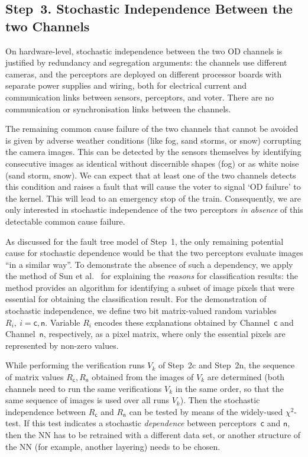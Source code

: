 \documentclass[runningheads,a4paper]{llncs}
\begin{document}
\subsection{Step~3. Stochastic Independence Between the two Channels}\label{sec:independence}

On hardware-level, stochastic independence between the two OD channels  is justified by  redundancy and segregation arguments: the channels use different cameras, and the perceptors  
are deployed on different processor boards with separate power supplies and wiring, both for electrical current and communication links between sensors, perceptors, and voter. There are no communication or synchronisation links between the channels.

The remaining common cause failure of the two channels that cannot be avoided is given by adverse weather conditions (like fog, sand storms, or  snow) corrupting the camera images. This can be detected by the sensors themselves by identifying consecutive images as identical without discernible shapes (fog) or as white noise (sand storm, snow). We can expect that at least one of the two channels detects this condition and raises a fault that will cause the voter to signal `OD failure' to the kernel. This will lead to an emergency stop of the train.  
Consequently, we are only interested in stochastic independence of the two perceptors {\it in absence} of this detectable common cause failure.

As discussed for the fault tree model of Step~1, the only remaining potential cause for   stochastic dependence would be that the two perceptors evaluate images ``in a similar way''.
To demonstrate the absence of such a dependency, we apply the method of Sun et al.~\cite{DBLP:conf/eccv/SunCHK20} for explaining the {\it reasons} for classification results: the method provides an algorithm for identifying a subset of image pixels that were essential for obtaining the classification result. For the demonstration of stochastic independence, we
define  two  bit matrix-valued random variables $R_i,\ i = \mathsf{c},\mathsf{n}$. 
Variable $R_i$ encodes these explanations obtained by Channel~$\mathsf{c}$ and Channel~$\mathsf{n}$, respectively, as  a pixel matrix, where only the essential pixels are represented by non-zero values. 

While performing the verification runs $V_k$ of Step~2c and Step~2n, the sequence of matrix values $R_\mathsf{c}, R_\mathsf{n}$ obtained from the images of $V_k$ are determined (both channels need to run the same verifications $V_k$ in the same order, so that the same sequence of images is used over all runs $V_k$). Then the stochastic independence between $R_\mathsf{c}$ and $R_\mathsf{n}$ can be tested by means of the
widely-used $\chi^2$-test. If this test indicates a stochastic {\it dependence} between perceptors~$\mathsf{c}$ and $\mathsf{n}$, then the NN has to be retrained with a different data set, or another structure of the NN (for example, another layering) needs to be chosen.  
\end{document}
